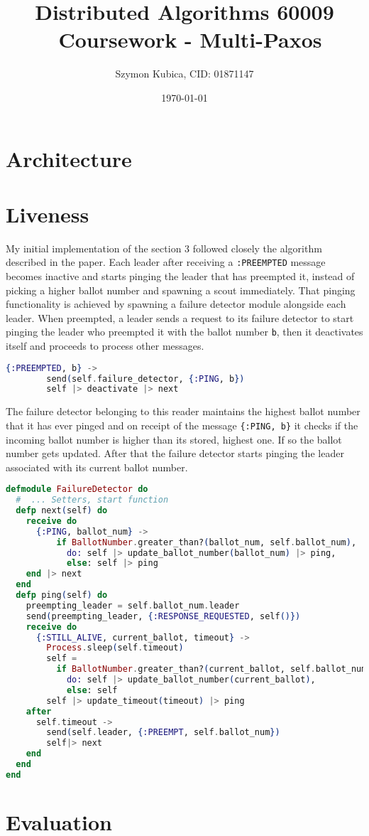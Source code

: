 \documentclass[11pt]{article}
\begin{document}
\title{Distributed Algorithms 60009 \ Coursework - Multi-Paxos}
\date{\today}
\author{Szymon Kubica, CID: 01871147}
\maketitle

\section*{Architecture}
\pagebreak
\section*{Liveness}
My initial implementation of the section 3 followed closely the algorithm
described in the paper. Each leader after receiving a \texttt{:PREEMPTED} message
becomes inactive and starts pinging the leader that has preempted it, instead of
picking a higher ballot number and spawning a scout immediately. That pinging
functionality is achieved by spawning a failure detector module alongside each
leader. When preempted, a leader sends a request to its failure detector to start
pinging the leader who preempted it with the ballot number \texttt{b}, then it
deactivates itself and proceeds to process other messages.
\begin{lstlisting}[language=elixir, caption={Super fancy code},captionpos=b]
      {:PREEMPTED, b} ->
        send(self.failure_detector, {:PING, b})
        self |> deactivate |> next
\end{lstlisting}
The failure detector belonging to this reader maintains the highest ballot number
that it has ever pinged and on receipt of the message \texttt{\{:PING, b\}} it
checks if the incoming ballot number is higher than its stored, highest one. If so
the ballot number gets updated. After that the failure detector starts pinging
the leader associated with its current ballot number.

\begin{lstlisting}[language=elixir, caption={Super fancy code},captionpos=b]
defmodule FailureDetector do
  #  ... Setters, start function
  defp next(self) do
    receive do
      {:PING, ballot_num} ->
          if BallotNumber.greater_than?(ballot_num, self.ballot_num),
            do: self |> update_ballot_number(ballot_num) |> ping,
            else: self |> ping
    end |> next
  end
  defp ping(self) do
    preempting_leader = self.ballot_num.leader
    send(preempting_leader, {:RESPONSE_REQUESTED, self()})
    receive do
      {:STILL_ALIVE, current_ballot, timeout} ->
        Process.sleep(self.timeout)
        self =
          if BallotNumber.greater_than?(current_ballot, self.ballot_num),
            do: self |> update_ballot_number(current_ballot),
            else: self
        self |> update_timeout(timeout) |> ping
    after
      self.timeout ->
        send(self.leader, {:PREEMPT, self.ballot_num})
        self|> next
    end
  end
end

\end{lstlisting}
\section*{Evaluation}
\end{document}
